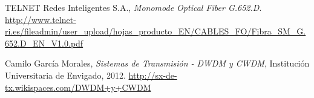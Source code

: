 
%
%
%
	
%

\begin{thebibliography}{9}

  TELNET Redes Inteligentes S.A.,
  \emph{Monomode Optical Fiber G.652.D}.
  \url{http://www.telnet-ri.es/fileadmin/user_upload/hojas_producto_EN/CABLES_FO/Fibra_SM_G.652.D_EN_V1.0.pdf}
  
  Camilo Garc\'ia Morales,
  \emph{Sistemas de Transmisi\'on - DWDM y CWDM},
  Instituci\'on Universitaria de Envigado,
  2012.
  \url{http://sx-de-tx.wikispaces.com/DWDM+y+CWDM}

\end{thebibliography}